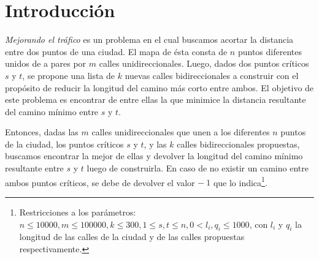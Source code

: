 \section{Introducción}

\textit{Mejorando el tráfico} es un problema en el cual buscamos acortar la distancia entre dos puntos de una ciudad. El mapa de ésta consta de $n$ puntos diferentes unidos de a pares por $m$ calles unidireccionales. Luego, dados dos puntos críticos $s$ y $t$, se propone una lista de $k$ nuevas calles bidireccionales a construir con el propósito de reducir la longitud del camino más corto entre ambos. El objetivo de este problema es encontrar de entre ellas la que minimice la distancia resultante del camino mínimo entre $s$ y $t$.

\vspace{1em}

Entonces, dadas las $m$ calles unidireccionales que unen a los diferentes $n$ puntos de la ciudad, los puntos críticos $s$ y $t$, y las $k$ calles bidireccionales propuestas, buscamos encontrar la mejor de ellas y devolver la longitud del camino mínimo resultante entre $s$ y $t$ luego de construirla. En caso de no existir un camino entre ambos puntos críticos, se debe de devolver el valor $-\ 1$ que lo indica\footnote{Restricciones a los parámetros: \\ \indent \indent $n \leq 10000, m \leq 100000, k \leq 300, 1 \leq s, t \leq n, 0 < l_i, q_i \leq 1000$, con $l_i$ y $q_i$ la longitud de las calles de la ciudad \indent \indent y de las calles propuestas respectivamente.}.

\vspace{1em}